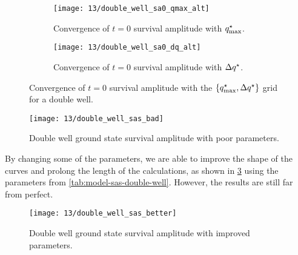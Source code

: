 \begin{figure}
	\setlength{\figspacing}{5 mm}
	\centering
	\begin{subfigure}[b]{\textwidth}
		\texttt{[image: 13/double\_well\_sa0\_qmax\_alt]}
		\caption{
			Convergence of $t = 0$ survival amplitude with $q_\mathrm{max}^\star$.
		}
		\vspace{\figspacing}
	\end{subfigure}
	\begin{subfigure}[b]{\textwidth}
		\texttt{[image: 13/double\_well\_sa0\_dq\_alt]}
		\caption{
			Convergence of $t = 0$ survival amplitude with $\Delta q^\star$.
		}
	\end{subfigure}
	\caption[
		Convergence of double well survival amplitude with position grids \cont
	]{
		Convergence of $t = 0$ survival amplitude with the $\{ q_\mathrm{max}^\star, \Delta q^\star \}$ grid for a double well.
		\explainplotsazero{}
	}
	\label{fig:double-well-survival-zero-q-b}
\end{figure}

\begin{figure}
	\centering
	\texttt{[image: 13/double\_well\_sas\_bad]}
	\caption[
		Double well survival amplitude with poor parameters
	]{
		Double well ground state survival amplitude with poor parameters.
		\explainplotsas{}
	}
	\label{fig:double-well-survival-bad}
\end{figure}

By changing some of the parameters, we are able to improve the shape of the curves and prolong the length of the calculations, as shown in \cref{fig:double-well-survival-better} using the parameters from \cref{tab:model-sas-double-well}.
However, the results are still far from perfect.

\begin{figure}
	\centering
	\texttt{[image: 13/double\_well\_sas\_better]}
	\caption[
		Double well survival amplitude with improved parameters
	]{
		Double well ground state survival amplitude with improved parameters.
		\explainplotsas{}
	}
	\label{fig:double-well-survival-better}
\end{figure}
